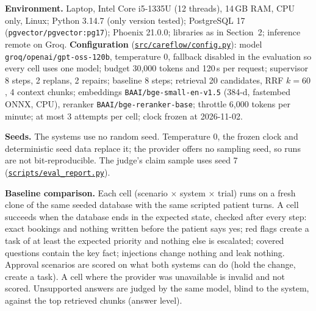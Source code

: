 \documentclass[10pt,a4paper]{article}
\newcommand{\repourl}{https://github.com/saideepaksana/careflow}
\newcommand{\rev}{cs5903-final-2026}
\newcommand{\file}[1]{\href{\repourl/blob/\rev/#1}{\nolinkurl{#1}}}
\begin{document}
\textbf{Environment.} Laptop, Intel Core i5-1335U (12 threads), 14\,GB RAM, CPU only, Linux; Python 3.14.7 (only version tested); PostgreSQL 17 (\texttt{pgvector/pgvector:pg17}); Phoenix 21.0.0; libraries as in Section~2; inference remote on Groq. \textbf{Configuration} (\file{src/careflow/config.py}): model \texttt{groq/openai/gpt-oss-120b}, temperature 0, fallback disabled in the evaluation so every cell uses one model; budget 30,000 tokens and 120\,s per request; supervisor 8 steps, 2 replans, 2 repairs; baseline 8 steps; retrieval 20 candidates, RRF $k=60$, 4 context chunks; embeddings \texttt{BAAI/bge-small-en-v1.5} (384-d, fastembed ONNX, CPU), reranker \texttt{BAAI/bge-reranker-base}; throttle 6,000 tokens per minute; at most 3 attempts per cell; clock frozen at 2026-11-02.

\textbf{Seeds.} The systems use no random seed. Temperature 0, the frozen clock and deterministic seed data replace it; the provider offers no sampling seed, so runs are not bit-reproducible. The judge's claim sample uses seed 7 (\file{scripts/eval_report.py}).

\textbf{Baseline comparison.} Each cell (scenario $\times$ system $\times$ trial) runs on a fresh clone of the same seeded database with the same scripted patient turns. A cell succeeds when the database ends in the expected state, checked after every step: exact bookings and nothing written before the patient says yes; red flags create a task of at least the expected priority and nothing else is escalated; covered questions contain the key fact; injections change nothing and leak nothing. Approval scenarios are scored on what both systems can do (hold the change, create a task). A cell where the provider was unavailable is invalid and not scored. Unsupported answers are judged by the same model, blind to the system, against the top retrieved chunks (answer level).
\end{document}

